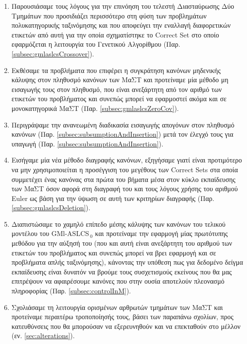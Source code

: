 \begin{enumerate}[I]
\item Παρουσιάσαμε τους λόγους για την επινόηση του τελεστή Διασταύρωσης Δύο Τμημάτων που προσιδιάζει περισσότερο στη φύση των προβλημάτων πολυκατηγορικής ταξινόμησης και που αποφεύγει την εναλλαγή διαφορετικών ετικετών από αυτή για την οποία σχηματίστηκε το Correct Set στο οποίο εφαρμόζεται η λειτουργία του Γενετικού Αλγορίθμου (Παρ. \ref{subsec:gmlaslcsCrossover}).

\item Εκθέσαμε τα προβλήματα που επιφέρει η συγκράτηση κανόνων μηδενικής κάλυψης στον πληθυσμό κανόνων των ΜαΣΤ και προτείναμε μία μέθοδο μη εισαγωγής τους στον πληθυσμό, που είναι ανεξάρτητη από τον αριθμό των ετικετών του προβλήματος και συνεπώς μπορεί να εφαρμοστεί ακόμα και σε μονοκατηγορικά ΜαΣΤ (Παρ. \ref{subsec:gmlaslcsZeroCov}).

\item Περιγράψαμε την ανανεωμένη διαδικασία εισαγωγής απογόνων στον πληθυσμό κανόνων (Παρ. \ref{subsec:subsumptionAndInsertion}) μετά τον έλεγχό τους για υπαγωγή (Παρ. \ref{subsec:subsumptionAndInsertion}).

\item Εισήγαμε μία νέα μέθοδο διαγραφής κανόνων, εξηγήσαμε γιατί είναι προτιμότερο να μην χρησιμοποιείται η προσέγγιση του μεγέθους των Correct Sets στα οποία συμμετέχει ένας κανόνας στα πρώτα του βήματα μέσα στον κύκλο εκπαίδευσης των ΜαΣΤ όσον αφορά στη διαγραφή του και τους λόγους χρήσης του αριθμού Euler ως βάση για την ύψωση σε αυτή των κριτηρίων διαγραφής (Παρ. \ref{subsec:gmlaslcsDeletion}).

\item Διαπιστώσαμε το χαμηλό επίπεδο μέσης κάλυψης των κανόνων του τελικού μοντέλου του GMl-ASLCS$_{\:0}$ και προτείναμε την εφαρμογή μίας πρωτότυπης μεθόδου για την αύξησή του (που και αυτή είναι ανεξάρτητη του αριθμού των ετικετών του προβλήματος και συνεπώς μπορεί να βρει εφαρμογή και σε προβλήματα απλής ταξινόμησης), κάνοντας την υπόθεση πως για δεδομένο δείγμα εκπαίδευσης είναι δυνατόν να βρούμε τους συσχετισμούς εκείνους που θα μας επιτρέψουν να αφαιρέσουμε κανόνες που στην ουσία αποτελούν πλεονασμό πληροφορίας (Παρ. \ref{subsec:controlInM}).

\item Σχολιάσαμε τη λειτουργία ορισμένων αρθρωτών τμημάτων των ΜαΣΤ και προτείναμε περαιτέρω τροποποίησής τους, βάσει των παραπάνω σχολίων, προς κατευθύνσεις που θα μπορούσαν να εξερευνηθούν και να επεκταθούν στο μέλλον (εν. \ref{sec:alterations}).

\end{enumerate}
 





